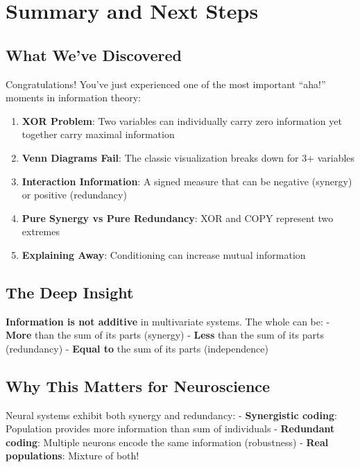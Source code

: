\documentclass[
  11pt,
  letterpaper,
  oneside,
  openany]{book}
\providecommand{\tightlist}{%
  \setlength{\itemsep}{0pt}\setlength{\parskip}{0pt}}
\begin{document}
\section{Summary and Next Steps}\label{summary-and-next-steps}

\subsection{What We've Discovered}\label{what-weve-discovered}

Congratulations! You've just experienced one of the most important
``aha!'' moments in information theory:

\begin{enumerate}
\def\labelenumi{\arabic{enumi}.}
\tightlist
\item
  \textbf{XOR Problem}: Two variables can individually carry zero
  information yet together carry maximal information
\item
  \textbf{Venn Diagrams Fail}: The classic visualization breaks down for
  3+ variables
\item
  \textbf{Interaction Information}: A signed measure that can be
  negative (synergy) or positive (redundancy)
\item
  \textbf{Pure Synergy vs Pure Redundancy}: XOR and COPY represent two
  extremes
\item
  \textbf{Explaining Away}: Conditioning can increase mutual information
\end{enumerate}

\subsection{The Deep Insight}\label{the-deep-insight}

\textbf{Information is not additive} in multivariate systems. The whole
can be: - \textbf{More} than the sum of its parts (synergy) -
\textbf{Less} than the sum of its parts (redundancy) - \textbf{Equal to}
the sum of its parts (independence)

\subsection{Why This Matters for
Neuroscience}\label{why-this-matters-for-neuroscience}

Neural systems exhibit both synergy and redundancy: -
\textbf{Synergistic coding}: Population provides more information than
sum of individuals - \textbf{Redundant coding}: Multiple neurons encode
the same information (robustness) - \textbf{Real populations}: Mixture
of both!
\end{document}
